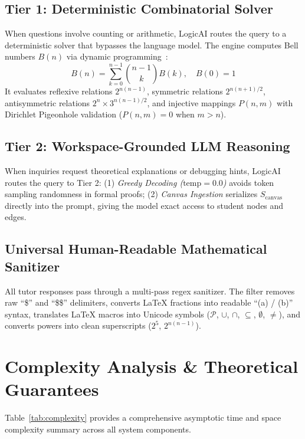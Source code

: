 \documentclass[conference]{IEEEtran}
\begin{document}
\subsection{Tier 1: Deterministic Combinatorial Solver}
When questions involve counting or arithmetic, LogicAI routes the query to a deterministic solver that bypasses the language model. The engine computes Bell numbers $B(n)$ via dynamic programming~\cite{bell1934}:
\begin{equation}
B(n) = \sum_{k=0}^{n-1} \binom{n-1}{k} B(k), \quad B(0) = 1
\end{equation}
It evaluates reflexive relations $2^{n(n-1)}$, symmetric relations $2^{n(n+1)/2}$, antisymmetric relations $2^n \times 3^{n(n-1)/2}$, and injective mappings $P(n, m)$ with Dirichlet Pigeonhole validation ($P(n, m) = 0$ when $m > n$).

\subsection{Tier 2: Workspace-Grounded LLM Reasoning}
When inquiries request theoretical explanations or debugging hints, LogicAI routes the query to Tier 2: (1) \textit{Greedy Decoding ($\text{temp} = 0.0$)} avoids token sampling randomness in formal proofs; (2) \textit{Canvas Ingestion} serializes $S_{\text{canvas}}$ directly into the prompt, giving the model exact access to student nodes and edges.

\subsection{Universal Human-Readable Mathematical Sanitizer}
All tutor responses pass through a multi-pass regex sanitizer. The filter removes raw ``\$'' and ``\$\$'' delimiters, converts \LaTeX{} fractions into readable ``(a) / (b)'' syntax, translates \LaTeX{} macros into Unicode symbols ($\mathcal{P}$, $\cup$, $\cap$, $\subseteq$, $\emptyset$, $\neq$), and converts powers into clean superscripts ($2^5$, $2^{n(n-1)}$).

\section{Complexity Analysis \& Theoretical Guarantees}
Table~\ref{tab:complexity} provides a comprehensive asymptotic time and space complexity summary across all system components.
\end{document}
